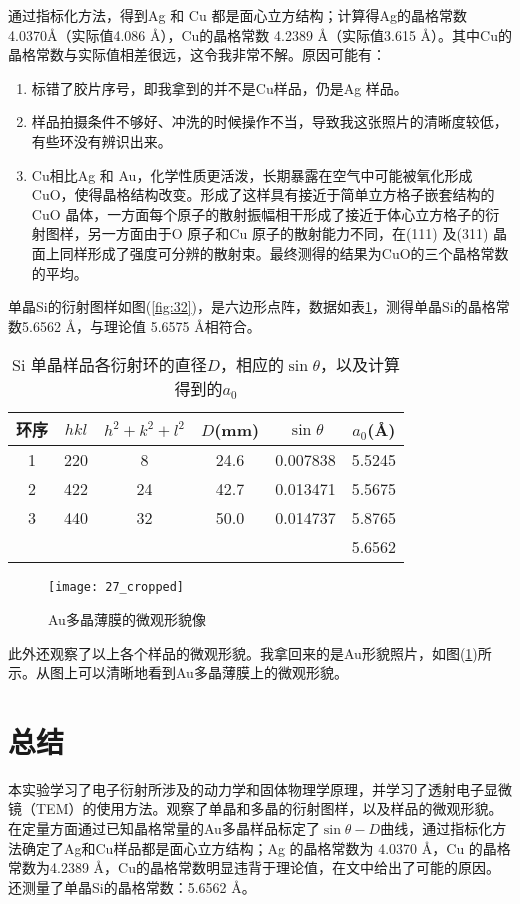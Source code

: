 \documentclass[aps,pre,12pt,preprint,onecolumn,showpacs,showkeys]{revtex4-1}
\begin{document}
    通过指标化方法，得到Ag 和 Cu 都是面心立方结构；计算得Ag的晶格常数 4.0370\AA （实际值4.086 \AA），Cu的晶格常数 4.2389 \AA （实际值3.615 \AA）。其中Cu的晶格常数与实际值相差很远，这令我非常不解。原因可能有：
    \begin{enumerate}
        \item 标错了胶片序号，即我拿到的并不是Cu样品，仍是Ag 样品。
        \item 样品拍摄条件不够好、冲洗的时候操作不当，导致我这张照片的清晰度较低，有些环没有辨识出来。
        \item Cu相比Ag 和 Au，化学性质更活泼，长期暴露在空气中可能被氧化形成 CuO，使得晶格结构改变。形成了这样具有接近于简单立方格子嵌套结构的CuO 晶体，一方面每个原子的散射振幅相干形成了接近于体心立方格子的衍射图样，另一方面由于O 原子和Cu 原子的散射能力不同，在(111) 及(311) 晶面上同样形成了强度可分辨的散射束。最终测得的结果为CuO的三个晶格常数的平均。
    \end{enumerate}

    单晶Si的衍射图样如图(\ref{fig:32})，是六边形点阵，数据如表\ref{tab:Si}，测得单晶Si的晶格常数5.6562 \AA ，与理论值 5.6575 \AA 相符合。
    
    \begin{table}[h]
		\caption{\label{tab:Si}%
		Si 单晶样品各衍射环的直径$D$，相应的$\sin \theta$，以及计算得到的$a_0$}
		\begin{tabular}{|c|c|c|c|c|c|}
			\hline
			环序&$hkl$&$h^2+k^2+l^2$&$D$(mm)&$\sin \theta$&$a_0$(\AA)\\\hline
            1 & 220&  8 &  24.6 &  0.007838 &5.5245\\\hline 
            2 & 422& 24 &  42.7 &  0.013471 &5.5675\\\hline
            3 & 440& 32 &  50.0 &  0.014737 &5.8765\\\hline
            &&&&&5.6562\\\hline
        \end{tabular}
    \end{table}


    \begin{figure}[ht]
        \centering
        \texttt{[image: 27\_cropped]}
        \caption{\label{fig:27}%
        Au多晶薄膜的微观形貌像}
    \end{figure}

    此外还观察了以上各个样品的微观形貌。我拿回来的是Au形貌照片，如图(\ref{fig:27})所示。从图上可以清晰地看到Au多晶薄膜上的微观形貌。

\section{总结}
    本实验学习了电子衍射所涉及的动力学和固体物理学原理，并学习了透射电子显微镜（TEM）的使用方法。观察了单晶和多晶的衍射图样，以及样品的微观形貌。在定量方面通过已知晶格常量的Au多晶样品标定了$\sin \theta - D$曲线，通过指标化方法确定了Ag和Cu样品都是面心立方结构；Ag 的晶格常数为 4.0370 \AA，Cu 的晶格常数为4.2389 \AA，Cu的晶格常数明显违背于理论值，在文中给出了可能的原因。还测量了单晶Si的晶格常数：5.6562 \AA。
\end{document}

